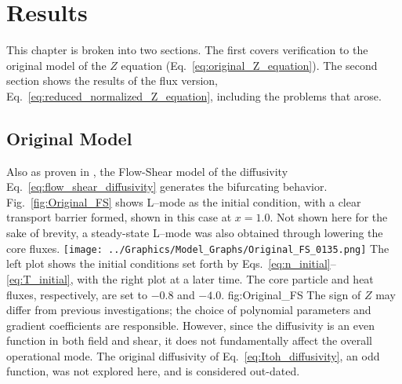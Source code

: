\chapter{Results}\label{chapter:results}
This chapter is broken into two sections.
The first covers verification to the original model of the $Z$ equation (Eq.~\ref{eq:original_Z_equation}).
The second section shows the results of the flux version, Eq.~\ref{eq:reduced_normalized_Z_equation}, including the problems that arose.

\section{Original Model} \label{sec:original_results}
Also as proven in \cite{paquay_studying_2012}, the Flow-Shear model of the diffusivity Eq.~\ref{eq:flow_shear_diffusivity} generates the bifurcating behavior.
Fig.~\ref{fig:Original_FS} shows L--mode as the initial condition, with a clear transport barrier formed, shown in this case at $x = 1.0$.
Not shown here for the sake of brevity, a steady-state L--mode was also obtained through lowering the core fluxes.
	{\texttt{[image: ../Graphics/Model\_Graphs/Original\_FS\_0135.png]}}
	{The left plot shows the initial conditions set forth by Eqs.~\ref{eq:n_initial}--\ref{eq:T_initial}, with the right plot at a later time.
	The core particle and heat fluxes, respectively, are set to $-0.8$ and $-4.0$.}
	{fig:Original_FS}
The sign of $Z$ may differ from previous investigations; the choice of polynomial parameters and gradient coefficients are responsible.
However, since the diffusivity is an even function in both field and shear, it does not fundamentally affect the overall operational mode.
The original diffusivity of Eq.~\ref{eq:Itoh_diffusivity}, an odd function, was not explored here, and is considered out-dated.

